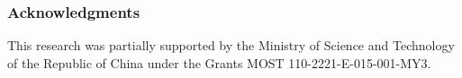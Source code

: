 \documentclass[runningheads,a4paper]{llncs}
\begin{document}
	
	
	
	
	
	
	
	
	
	\subsubsection*{Acknowledgments}
	This research was partially supported by the Ministry of Science and Technology of the Republic of China under the Grants MOST 110-2221-E-015-001-MY3.
	
	
	
	
	
	
	
	
\end{document}

